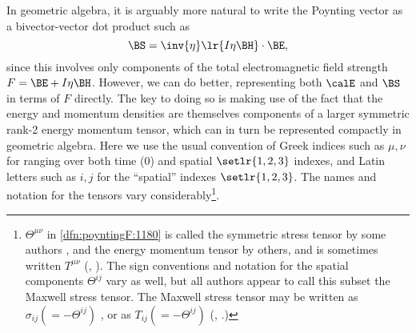 In geometric algebra, it is arguably more natural to write the Poynting vector as a bivector-vector dot product such as
\begin{dmath}\label{eqn:poyntingF:1100}
\BS = \inv{\eta} \lr{ I \eta \BH } \cdot \BE,
\end{dmath}
since this involves only components of the total electromagnetic field strength \( F = \BE + I \eta \BH \).
However, we can do better, representing both \( \calE \) and \( \BS \) in terms of \( F \) directly.  The key to doing so is making use of the fact that
the energy and momentum densities are themselves components of a larger symmetric rank-2 energy momentum tensor, which can in turn be represented
compactly in geometric algebra.
\index{\(\Theta^{\mu\nu}\)}
\index{\(\lrT\)}
Here we use the usual convention of Greek indices such as \( \mu,\nu \) for ranging over both time (0) and spatial \( \setlr{1,2,3} \) indexes, and Latin letters such as \( i, j \)
for the ``spatial'' indexes
\( \setlr{1,2,3} \).
The names and notation for the tensors vary considerably\footnote{\( \Theta^{\mu\nu} \) in
\cref{dfn:poyntingF:1180}
is called the symmetric
stress tensor by some authors \citep{jackson1975cew},
and the energy momentum tensor by others, and is sometimes written \( T^{\mu\nu} \) (\citep{landau1980classical}, \citep{doran2003gap}).
The sign conventions and notation for the spatial components \( \Theta^{ij} \) vary as well, but all authors appear to call this subset the Maxwell stress tensor.
The Maxwell stress tensor may be written as \( \sigma_{ij} (=-\Theta^{ij}) \) \citep{landau1980classical}, or as
\( T_{ij} (=-\Theta^{ij}) \)
(\citep{griffiths1999introduction}, \citep{jackson1975cew}.)
}.

